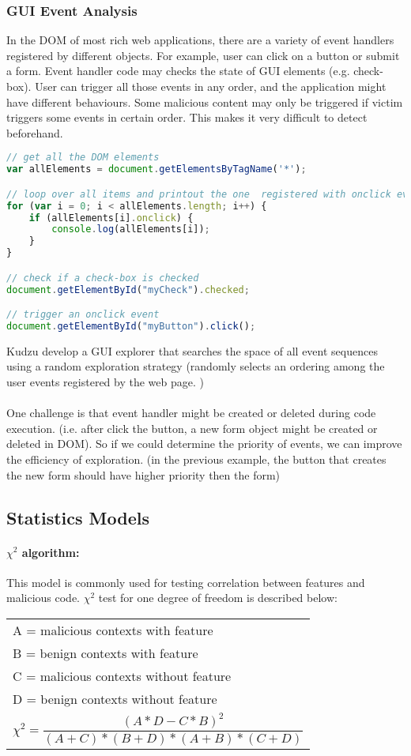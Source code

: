 \subsubsection{GUI Event Analysis}
In the DOM of most rich web applications, there are a variety of event handlers registered by different objects. For example, user can click on a button or submit a form. Event handler code may checks the state of GUI elements (e.g. check-box). User can trigger all those events in any order, and the application might have different behaviours. Some malicious content may only be triggered if victim triggers some events in certain order. This makes it very difficult to detect beforehand.
\begin{lstlisting}[language=JavaScript, title=(examples of finding and triggering GUI elements in DOM)]
// get all the DOM elements
var allElements = document.getElementsByTagName('*');

// loop over all items and printout the one  registered with onclick event
for (var i = 0; i < allElements.length; i++) {
	if (allElements[i].onclick) {
		console.log(allElements[i]);
	}
}

// check if a check-box is checked
document.getElementById("myCheck").checked;

// trigger an onclick event
document.getElementById("myButton").click();
\end{lstlisting}
Kudzu \cite{Kudzu} develop a GUI explorer that searches the space of all event sequences using a random exploration strategy (randomly selects an ordering among the user events registered by the web page. ) \\ \\
One challenge is that event handler might be created or deleted during code execution. (i.e. after click the button, a new form object might be created or deleted  in DOM). So if we could determine the priority of events, we can improve the efficiency of exploration. (in the previous example, the button that creates the new form should have higher priority then the form)
\newpage
\subsection{Statistics Models}
\paragraph{$\chi^{2}$ algorithm:} 
This model is commonly used for testing correlation between features and malicious code. $\chi^{2}$ test for one degree of freedom is described below:
\begin{center}
\begin{tabular}{ |p{10cm}| } 
\hline
A = malicious contexts with feature \\
B = benign contexts with feature \\
C = malicious contexts without feature \\
D = benign contexts without feature \\
$$\chi^{2}=\frac{(A*D-C*B)^{2}}{(A+C)*(B+D)*(A+B)*(C+D)}$$ \\
\hline
\end{tabular}
\end{center}
\phantom \\
